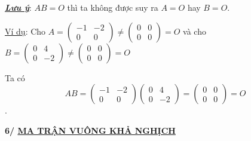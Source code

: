 \documentclass[12pt,a4paper]{article} \usepackage[utf8]{inputenc} \usepackage[T5]{fontenc} \usepackage[vietnamese]{babel} \usepackage{amsmath, amssymb, amsfonts} \usepackage{ulem}
\begin{document}
\emph{\textbf{\ul{Lưu ý}}}: $AB = O$ thì ta không được suy ra $A = O$ hay $B = O$.

\ul{Ví dụ}: Cho
$A = \begin{pmatrix} -1 & -2 \\ 0 & 0 \end{pmatrix} \neq \begin{pmatrix} 0 & 0 \\ 0 & 0 \end{pmatrix} = O$ và cho
$B = \begin{pmatrix} 0 & 4 \\ 0 & -2 \end{pmatrix} \neq \begin{pmatrix} 0 & 0 \\ 0 & 0 \end{pmatrix} = O$

Ta có $$
AB = \begin{pmatrix} -1 & -2 \\ 0 & 0 \end{pmatrix} \begin{pmatrix} 0 & 4 \\ 0 & -2 \end{pmatrix} = \begin{pmatrix} 0 & 0 \\ 0 & 0 \end{pmatrix} = O
$$.

\textbf{6/ \ul{MA TRẬN VUÔNG KHẢ NGHỊCH}}
\end{document}
